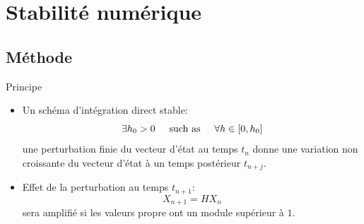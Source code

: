 \section{Stabilité numérique}
\subsection{Méthode}
\begin{frame}{Principe}
\begin{itemize}
\item Un schéma d'intégration direct stable:
\begin{equation*}
\exists h_0 > 0 \hspace{0.5cm}\text{such as} \hspace{0.5cm} \forall h \in [0,h_0]
\end{equation*}  
une perturbation finie du vecteur d'état au temps $t_n$ donne une variation non croissante du vecteur d'état à un temps postérieur $t_{n+j}$.

\item Effet de la perturbation au temps $t_{n+1}$:
\begin{equation}
X_{n+1} = H X_n
\end{equation}sera amplifié si les valeurs propre ont un module supérieur à $1$.
\end{itemize}
\end{frame}

